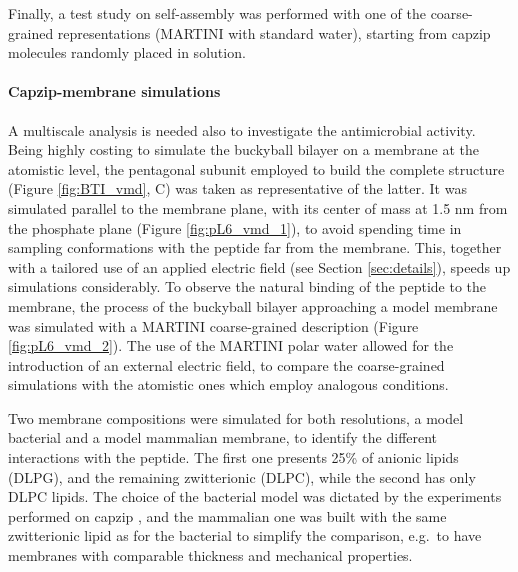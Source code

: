 Finally, a test study on self-assembly was performed with one of the coarse-grained representations (MARTINI with standard water), starting from capzip molecules randomly placed in solution.

\paragraph{Capzip-membrane simulations} A multiscale analysis is needed also to investigate the antimicrobial activity. Being highly costing to simulate the buckyball bilayer on a membrane at the atomistic level, the pentagonal subunit employed to build the complete structure (Figure \ref{fig:BTI_vmd}, C) was taken as representative of the latter. It was simulated parallel to the membrane plane, with its center of mass at 1.5 nm from the phosphate plane (Figure \ref{fig:pL6_vmd_1}), to avoid spending time in sampling conformations with the peptide far from the membrane. This, together with a tailored use of an applied electric field (see Section \ref{sec:details}), speeds up simulations considerably.
%
To observe the natural binding of the peptide to the membrane, the process of the buckyball bilayer approaching a model membrane was simulated with a MARTINI coarse-grained description (Figure \ref{fig:pL6_vmd_2}). The use of the MARTINI polar water \citep{Yesylevskyy2010} allowed for the introduction of an external electric field, to compare the coarse-grained simulations with the atomistic ones which employ analogous conditions.

Two membrane compositions were simulated for both resolutions, a model bacterial and a model mammalian membrane, to identify the different interactions with the peptide. The first one presents 25\% of anionic lipids (DLPG), and the remaining zwitterionic (DLPC), while the second has only DLPC lipids. The choice of the bacterial model was dictated by the experiments performed on capzip \citep{Castelletto2016}, and the mammalian one was built with the same zwitterionic lipid as for the bacterial to simplify the comparison, e.g.\ to have membranes with comparable thickness and mechanical properties.

